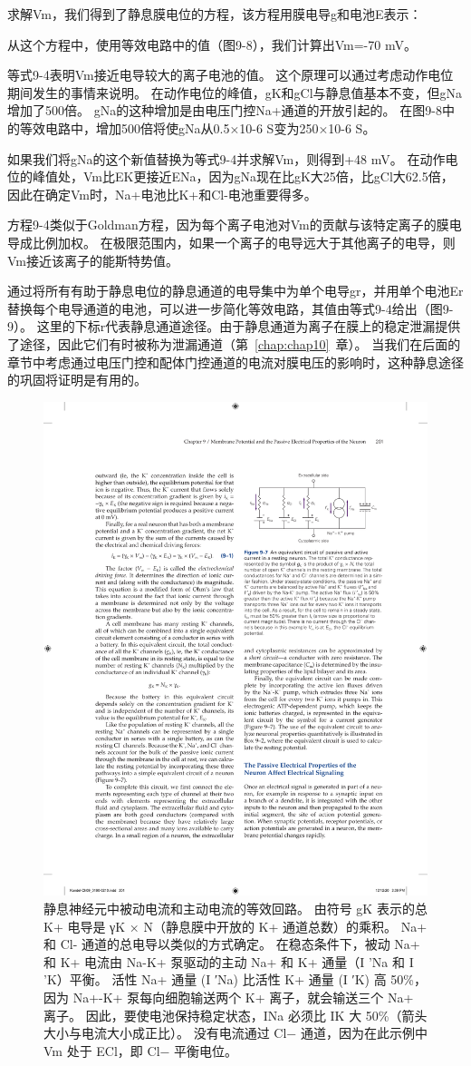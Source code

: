 \begin{proposition}[利用等效电路模型计算静息膜电位]
	\quad \quad 求解Vm，我们得到了静息膜电位的方程，该方程用膜电导g和电池E表示：
	
	\quad \quad 从这个方程中，使用等效电路中的值（图9-8），我们计算出Vm=-70 mV。
	
	\quad \quad 等式9-4表明Vm接近电导较大的离子电池的值。
	这个原理可以通过考虑动作电位期间发生的事情来说明。
	在动作电位的峰值，gK和gCl与静息值基本不变，但gNa增加了500倍。
	gNa的这种增加是由电压门控Na+通道的开放引起的。
	在图9-8中的等效电路中，增加500倍将使gNa从0.5×10-6 S变为250×10-6 S。
	
	\quad \quad 如果我们将gNa的这个新值替换为等式9-4并求解Vm，则得到+48 mV。
	在动作电位的峰值处，Vm比EK更接近ENa，因为gNa现在比gK大25倍，比gCl大62.5倍，因此在确定Vm时，Na+电池比K+和Cl-电池重要得多。
	
	\quad \quad 方程9-4类似于Goldman方程，因为每个离子电池对Vm的贡献与该特定离子的膜电导成比例加权。
	在极限范围内，如果一个离子的电导远大于其他离子的电导，则Vm接近该离子的能斯特势值。
	
	\quad \quad 通过将所有有助于静息电位的静息通道的电导集中为单个电导gr，并用单个电池Er替换每个电导通道的电池，可以进一步简化等效电路，其值由等式9-4给出（图9-9）。
	这里的下标r代表静息通道途径。由于静息通道为离子在膜上的稳定泄漏提供了途径，因此它们有时被称为泄漏通道（第~\ref{chap:chap10}~章）。
	当我们在后面的章节中考虑通过电压门控和配体门控通道的电流对膜电压的影响时，这种静息途径的巩固将证明是有用的。
	
\end{proposition}



\begin{figure}[htbp]
	\centering
	\includegraphics[width=0.5\linewidth]{chap09/fig_9_7}
	\caption{静息神经元中被动电流和主动电流的等效回路。 由符号 gK 表示的总 K+ 电导是 γK × N（静息膜中开放的 K+ 通道总数）的乘积。 Na+ 和 Cl- 通道的总电导以类似的方式确定。 在稳态条件下，被动 Na+ 和 K+ 电流由 Na-K+ 泵驱动的主动 Na+ 和 K+ 通量（I 'Na 和 I 'K）平衡。 活性 Na+ 通量 (I ′Na) 比活性 K+ 通量 (I ′K) 高 50\%，因为 Na+-K+ 泵每向细胞输送两个 K+ 离子，就会输送三个 Na+ 离子。 因此，要使电池保持稳定状态，INa 必须比 IK 大 50\%（箭头大小与电流大小成正比）。 没有电流通过 Cl− 通道，因为在此示例中 Vm 处于 ECl，即 Cl− 平衡电位。}
	\label{fig:9_7}
\end{figure}


